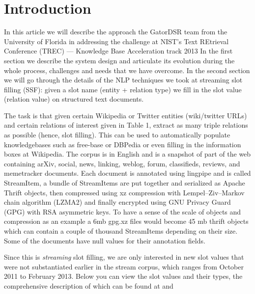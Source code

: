
\section{Introduction}

In this article we will describe the approach the GatorDSR team from the 
University of Florida in addressing the challenge at NIST’s Text 
REtrieval Conference (TREC) --- Knowledge Base Acceleration track 2013 
In the first section we describe 
the system design and articulate its evolution during the whole process, 
challenges and needs that we have overcome. In the second section we will go 
through the details of the NLP techniques we took at streaming slot filling
(SSF): given a slot name (entity + relation type) we fill in the slot value
(relation value) on structured text documents.

The task is that given certain Wikipedia or Twitter entities 
(wiki/twitter URLs) and certain relations of interest given in Table 1, 
extract as many triple relations as possible (hence, slot filling). This can 
be used to automatically populate knowledgebases such as free-base or DBPedia 
or even filling in the information boxes at Wikipedia. The corpus is in 
English and is a snapshot of part of the web containing arXiv, social, news, 
linking, weblog, forum, classifieds, reviews, and memetracker documents. Each 
document is annotated using lingpipe and is called StreamItem, a bundle of 
StreamItems are put together and serialized as Apache Thrift objects, then 
compressed using xz compression with Lempel–Ziv–Markov chain algorithm (LZMA2) 
and finally encrypted using GNU Privacy Guard (GPG) with RSA asymmetric keys.
To have a sense of the scale of objects and compression as an example a 6mb
gpg.xz files would become 45 mb thrift objects which can contain a couple of 
thousand StreamItems depending on their size. Some of the documents have null 
values for their annotation fields.

Since this is \textit{streaming} slot filling, we are only interested in new 
slot values that were not substantiated earlier in the stream corpus, which 
ranges from October 2011 to February 2013. Below you can view the slot values 
and their types, the comprehensive description of which can be found at
\cite{tackbp} and \cite{aec} 


